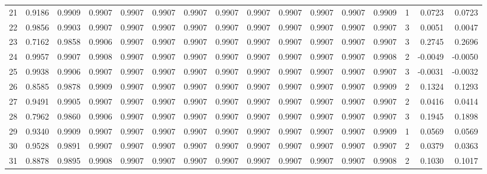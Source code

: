 \begin{tabular}{lrrrrrrrrrrrrrrr}
21  &      0.9186 &  0.9909 &  0.9907 &  0.9907 &  0.9907 &  0.9907 &  0.9907 &  0.9907 &  0.9907 &  0.9907 &   0.9907 &     0.9909 &      1 &                    0.0723 &                     0.0723 \\
22  &      0.9856 &  0.9903 &  0.9907 &  0.9907 &  0.9907 &  0.9907 &  0.9907 &  0.9907 &  0.9907 &  0.9907 &   0.9907 &     0.9907 &      3 &                    0.0051 &                     0.0047 \\
23  &      0.7162 &  0.9858 &  0.9906 &  0.9907 &  0.9907 &  0.9907 &  0.9907 &  0.9907 &  0.9907 &  0.9907 &   0.9907 &     0.9907 &      3 &                    0.2745 &                     0.2696 \\
24  &      0.9957 &  0.9907 &  0.9908 &  0.9907 &  0.9907 &  0.9907 &  0.9907 &  0.9907 &  0.9907 &  0.9907 &   0.9907 &     0.9908 &      2 &                   -0.0049 &                    -0.0050 \\
25  &      0.9938 &  0.9906 &  0.9907 &  0.9907 &  0.9907 &  0.9907 &  0.9907 &  0.9907 &  0.9907 &  0.9907 &   0.9907 &     0.9907 &      3 &                   -0.0031 &                    -0.0032 \\
26  &      0.8585 &  0.9878 &  0.9909 &  0.9907 &  0.9907 &  0.9907 &  0.9907 &  0.9907 &  0.9907 &  0.9907 &   0.9907 &     0.9909 &      2 &                    0.1324 &                     0.1293 \\
27  &      0.9491 &  0.9905 &  0.9907 &  0.9907 &  0.9907 &  0.9907 &  0.9907 &  0.9907 &  0.9907 &  0.9907 &   0.9907 &     0.9907 &      2 &                    0.0416 &                     0.0414 \\
28  &      0.7962 &  0.9860 &  0.9906 &  0.9907 &  0.9907 &  0.9907 &  0.9907 &  0.9907 &  0.9907 &  0.9907 &   0.9907 &     0.9907 &      3 &                    0.1945 &                     0.1898 \\
29  &      0.9340 &  0.9909 &  0.9907 &  0.9907 &  0.9907 &  0.9907 &  0.9907 &  0.9907 &  0.9907 &  0.9907 &   0.9907 &     0.9909 &      1 &                    0.0569 &                     0.0569 \\
30  &      0.9528 &  0.9891 &  0.9907 &  0.9907 &  0.9907 &  0.9907 &  0.9907 &  0.9907 &  0.9907 &  0.9907 &   0.9907 &     0.9907 &      2 &                    0.0379 &                     0.0363 \\
31  &      0.8878 &  0.9895 &  0.9908 &  0.9907 &  0.9907 &  0.9907 &  0.9907 &  0.9907 &  0.9907 &  0.9907 &   0.9907 &     0.9908 &      2 &                    0.1030 &                     0.1017 \\

\end{tabular}
